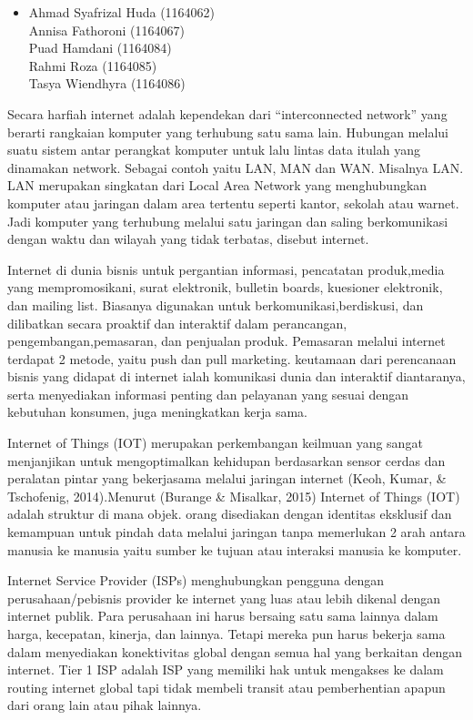 \documentclass[12pt, a4paper]{article}
\begin{document}
\begin{itemize}
        \item
        Ahmad Syafrizal Huda (1164062) \\
        Annisa Fathoroni (1164067) \\
        Puad Hamdani (1164084) \\
        Rahmi Roza (1164085) \\
        Tasya Wiendhyra (1164086) \\
\end{itemize}
    Secara harfiah internet adalah kependekan dari “interconnected network” yang berarti rangkaian komputer yang terhubung satu sama lain. Hubungan melalui suatu sistem antar perangkat komputer untuk lalu lintas data itulah yang dinamakan network. Sebagai contoh yaitu LAN, MAN dan WAN. Misalnya LAN. LAN merupakan singkatan dari Local Area Network yang menghubungkan komputer atau jaringan dalam area tertentu seperti kantor, sekolah atau warnet. Jadi komputer yang terhubung melalui satu jaringan dan saling berkomunikasi dengan waktu dan wilayah yang tidak terbatas, disebut internet.

    Internet di dunia bisnis untuk pergantian informasi, pencatatan produk,media yang mempromosikani, surat elektronik, bulletin boards, kuesioner elektronik, dan mailing list. Biasanya digunakan untuk berkomunikasi,berdiskusi, dan dilibatkan secara proaktif dan interaktif dalam perancangan, pengembangan,pemasaran, dan penjualan produk. Pemasaran melalui internet terdapat 2 metode, yaitu push dan pull marketing. keutamaan dari perencanaan bisnis yang didapat di internet ialah komunikasi dunia dan interaktif diantaranya, serta menyediakan informasi penting dan pelayanan yang sesuai dengan kebutuhan konsumen, juga meningkatkan kerja sama.

    Internet of Things (IOT) merupakan perkembangan keilmuan yang sangat menjanjikan untuk mengoptimalkan kehidupan berdasarkan sensor cerdas dan peralatan pintar yang bekerjasama melalui jaringan internet (Keoh, Kumar, & Tschofenig, 2014).Menurut (Burange & Misalkar, 2015) Internet of Things (IOT) adalah struktur di mana objek. orang disediakan dengan identitas eksklusif dan kemampuan untuk pindah data melalui jaringan tanpa memerlukan 2 arah antara manusia ke manusia yaitu sumber ke tujuan atau interaksi manusia ke komputer.

    Internet Service Provider (ISPs) menghubungkan pengguna dengan perusahaan/pebisnis provider ke internet yang luas atau lebih dikenal dengan internet publik. Para perusahaan ini harus bersaing satu sama lainnya dalam harga, kecepatan, kinerja, dan lainnya. Tetapi mereka pun harus bekerja sama dalam menyediakan konektivitas global dengan semua hal yang berkaitan dengan internet. Tier 1 ISP adalah ISP yang memiliki hak untuk mengakses ke dalam routing internet global tapi tidak membeli transit atau pemberhentian apapun dari orang lain atau pihak lainnya.
\end{document}
